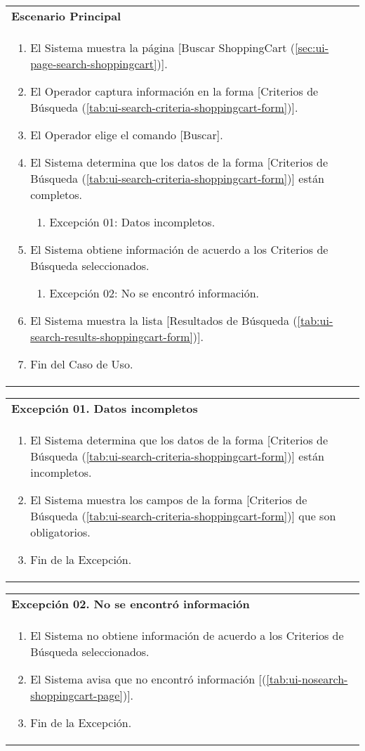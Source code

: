 	\begin{tabular}{ p{15.5cm} }
		\textbf{Escenario Principal} \\
		\begin{enumerate}
			\item El Sistema muestra la p\'agina [Buscar ShoppingCart (\ref{sec:ui-page-search-shoppingcart})].
			\item El Operador captura informaci\'on en la forma [Criterios de B\'usqueda (\ref{tab:ui-search-criteria-shoppingcart-form})].
			\item El Operador elige el comando [Buscar].
			\item El Sistema determina que los datos de la forma [Criterios de B\'usqueda (\ref{tab:ui-search-criteria-shoppingcart-form})] est\'an completos.
				\begin{enumerate}
					\item Excepci\'on 01: Datos incompletos.
				\end{enumerate}
			\item El Sistema obtiene informaci\'on de acuerdo a los Criterios de B\'usqueda seleccionados.
				\begin{enumerate}
					\item Excepci\'on 02: No se encontr\'o informaci\'on.
				\end{enumerate}
			\item El Sistema muestra la lista [Resultados de B\'usqueda (\ref{tab:ui-search-results-shoppingcart-form})].
			\item Fin del Caso de Uso.
		\end{enumerate}
	\end{tabular}
	
	\begin{tabular}{ p{15.5cm} }
		\textbf{Excepci\'on 01. Datos incompletos} \\
		\begin{enumerate}
			\item El Sistema determina que los datos de la forma [Criterios de B\'usqueda (\ref{tab:ui-search-criteria-shoppingcart-form})] est\'an incompletos.
			\item El Sistema muestra los campos de la forma [Criterios de B\'usqueda (\ref{tab:ui-search-criteria-shoppingcart-form})] que son obligatorios.
			\item Fin de la Excepci\'on.
		\end{enumerate}
	\end{tabular}
	
	\begin{tabular}{ p{15.5cm} }
		\textbf{Excepci\'on 02. No se encontr\'o informaci\'on} \\
		\begin{enumerate}
			\item El Sistema no obtiene informaci\'on de acuerdo a los Criterios de B\'usqueda seleccionados.
			\item El Sistema avisa que no encontr\'o informaci\'on [(\ref{tab:ui-nosearch-shoppingcart-page})].
			\item Fin de la Excepci\'on.
		\end{enumerate}
	\end{tabular}
	
